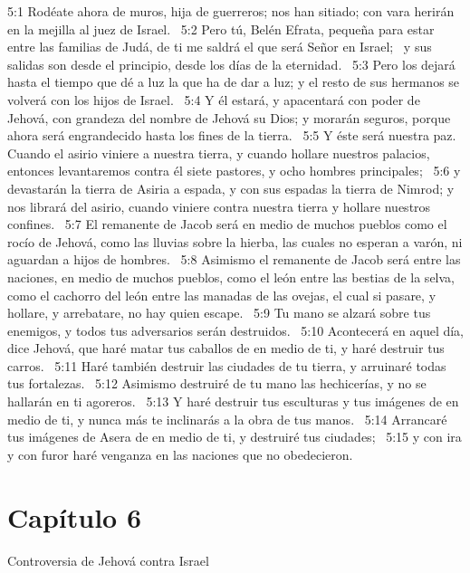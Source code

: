 5:1 Rodéate ahora de muros, hija de guerreros; nos han sitiado; con vara herirán en la mejilla al juez de Israel.  
5:2 Pero tú, Belén Efrata, pequeña para estar entre las familias de Judá, de ti me saldrá el que será Señor en Israel;  y sus salidas son desde el principio, desde los días de la eternidad.  
5:3 Pero los dejará hasta el tiempo que dé a luz la que ha de dar a luz; y el resto de sus hermanos se volverá con los hijos de Israel.  
5:4 Y él estará, y apacentará con poder de Jehová, con grandeza del nombre de Jehová su Dios; y morarán seguros, porque ahora será engrandecido hasta los fines de la tierra.  
5:5 Y éste será nuestra paz. Cuando el asirio viniere a nuestra tierra, y cuando hollare nuestros palacios, entonces levantaremos contra él siete pastores, y ocho hombres principales;  
5:6 y devastarán la tierra de Asiria a espada, y con sus espadas la tierra de Nimrod; y nos librará del asirio, cuando viniere contra nuestra tierra y hollare nuestros confines.  
5:7 El remanente de Jacob será en medio de muchos pueblos como el rocío de Jehová, como las lluvias sobre la hierba, las cuales no esperan a varón, ni aguardan a hijos de hombres.  
5:8 Asimismo el remanente de Jacob será entre las naciones, en medio de muchos pueblos, como el león entre las bestias de la selva, como el cachorro del león entre las manadas de las ovejas, el cual si pasare, y hollare, y arrebatare, no hay quien escape.  
5:9 Tu mano se alzará sobre tus enemigos, y todos tus adversarios serán destruidos.  
5:10 Acontecerá en aquel día, dice Jehová, que haré matar tus caballos de en medio de ti, y haré destruir tus carros.  
5:11 Haré también destruir las ciudades de tu tierra, y arruinaré todas tus fortalezas.  
5:12 Asimismo destruiré de tu mano las hechicerías, y no se hallarán en ti agoreros.  
5:13 Y haré destruir tus esculturas y tus imágenes de en medio de ti, y nunca más te inclinarás a la obra de tus manos.  
5:14 Arrancaré tus imágenes de Asera de en medio de ti, y destruiré tus ciudades;  
5:15 y con ira y con furor haré venganza en las naciones que no obedecieron.  
\section*{Capítulo 6}
Controversia de Jehová contra Israel  

